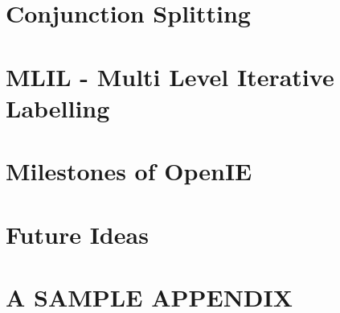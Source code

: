 \documentclass[BTech]{iitddiss}
\begin{document}
\chapter{Conjunction Splitting}
\label{chap:conjunction_splitting}



\chapter{MLIL - Multi Level Iterative Labelling}
\label{chap:mlil}



\chapter{Milestones of OpenIE}
\label{chap:milestones}



\chapter{Future Ideas}
\label{chap:future_ideas}



\appendix

\chapter{A SAMPLE APPENDIX}



\begin{singlespace}
  
  
\end{singlespace}


\listofpapers

\end{document}
